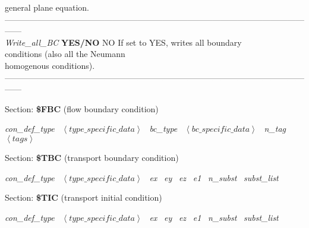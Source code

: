 \documentclass[a4paper]{article}
\begin{document}
\begin{tabbing}
										\> 									\> 				\>general plane equation.\\
------------------------------------------------------------------------------------------------------------------\\
\textit{Write\_all\_BC}	\> \textbf{YES/NO}	\> NO	\>If set to YES, writes all boundary\\
												\> 									\> 		\>conditions (also all the Neumann\\
												\> 									\> 		\>homogenous conditions).\\
------------------------------------------------------------------------------------------------------------------\\
\end{tabbing}

\normalsize

\begin{flushleft}
Section: \textbf{\$FBC} (flow boundary condition)


\textit{con\_def\_type} \ $\left\langle type\_specific\_data\right\rangle$ \ \textit{bc\_type} \ $\left\langle bc\_specific\_data\right\rangle$ \ \textit{n\_tag} \ $\left\langle tags\right\rangle$
\end{flushleft}



\begin{flushleft}
Section: \textbf{\$TBC} (transport boundary condition)

\textit{con\_def\_type} \ $\left\langle type\_specific\_data\right\rangle$ \ \textit{ex} \ \textit{ey} \ \textit{ez} \ \textit{e1} \ \textit{n\_subst} \ \textit{subst\_list}

\end{flushleft}



\begin{flushleft}
Section: \textbf{\$TIC} (transport initial condition)

\textit{con\_def\_type} \ $\left\langle type\_specific\_data\right\rangle$ \ \textit{ex} \ \textit{ey} \ \textit{ez} \ \textit{e1} \ \textit{n\_subst} \ \textit{subst\_list}
\end{flushleft}
\end{document}
